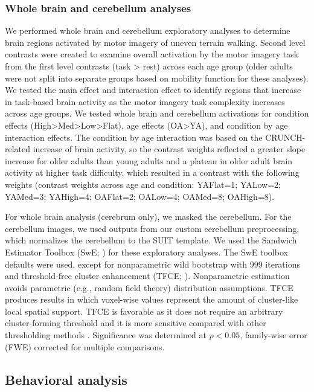\documentclass[a4paper,fleqn]{cas-sc}
\begin{document}
\subsubsection{Whole brain and cerebellum analyses}
We performed whole brain and cerebellum exploratory analyses to determine brain regions activated by motor imagery of uneven terrain walking. Second level contrasts were created to examine overall activation by the motor imagery task from the first level contrasts (task > rest) across each age group (older adults were not split into separate groups based on mobility function for these analyses). We tested the main effect and interaction effect to identify regions that increase in task-based brain activity as the motor imagery task complexity increases across age groups. We tested whole brain and cerebellum activations for condition effects (High>Med>Low>Flat), age effects (OA>YA), and condition by age interaction effects. The condition by age interaction was based on the CRUNCH-related increase of brain activity, so the contrast weights reflected a greater slope increase for older adults than young adults and a plateau in older adult brain activity at higher task difficulty, which resulted in a contrast with the following weights (contrast weights across age and condition: YAFlat=1; YALow=2; YAMed=3; YAHigh=4;  OAFlat=2; OALow=4; OAMed=8; OAHigh=8). 

For whole brain analysis (cerebrum only), we masked the cerebellum. For the cerebellum images, we used outputs from our custom cerebellum preprocessing, which normalizes the cerebellum to the SUIT template. We used the Sandwich Estimator Toolbox (SwE; \citealp{Guillaume2014}) for these exploratory analyses. The SwE toolbox defaults were used, except for nonparametric wild bootstrap with 999 iterations \citep{Guillaume2015} and threshold-free cluster enhancement (TFCE; \citealp{Smith2009}). Nonparametric estimation avoids parametric (e.g., random field theory) distribution assumptions. TFCE produces results in which voxel-wise values represent the amount of cluster-like local spatial support. TFCE is favorable as it does not require an arbitrary cluster-forming threshold and it is more sensitive compared with other thresholding methods \citep{Smith2009}. Significance was determined at $p<0.05$, family-wise error (FWE) corrected for multiple comparisons.

\subsection{Behavioral analysis}
\end{document}
